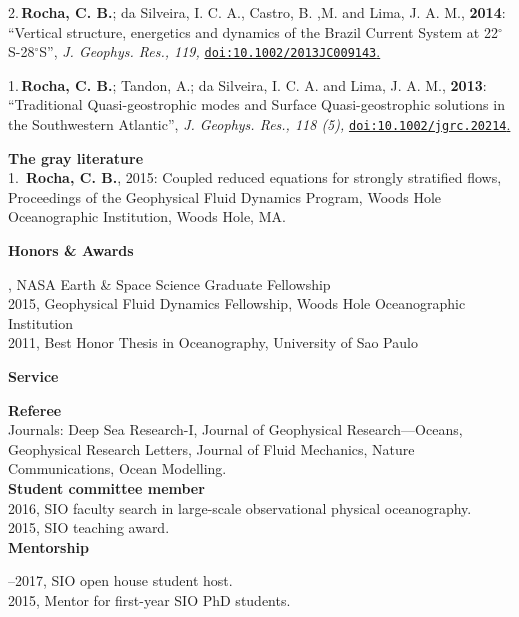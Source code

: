 \documentclass[a4paper,11pt,final]{memoir}
\newcommand{\Sep}{\vspace{1.25em}}
\newcommand{\SmallSep}{\vspace{0.5em}}
\newcommand{\CVSection}[1]
    {\Large\textbf{#1}\par
    \SmallSep\normalsize\normalfont}
\newcommand{\CVItem}[1]
    {\textbf{\color{NavyBlue} #1}}
\begin{document}
\SmallSep

2.\,\textbf{Rocha, C. B.};  da Silveira, I. C. A., Castro, B. ,M. and Lima, J. A. M., \textbf{2014}: ``Vertical structure, energetics and dynamics of the Brazil Current System at 22$^\circ$S-28$^\circ$S'', \textit{ J. Geophys. Res., 119,} \href{http://onlinelibrary.wiley.com/doi/10.1002/2013JC009143/abstract}{\texttt{doi:10.1002/2013JC009143}.}

\SmallSep

1.\,\textbf{Rocha, C. B.}; Tandon, A.; da Silveira, I. C. A. and Lima, J. A. M., \textbf{2013}: ``Traditional Quasi-geostrophic modes and Surface Quasi-geostrophic solutions in the Southwestern Atlantic'', \textit{ J. Geophys. Res., 118 (5),} \href{http://dx.doi.org/10.1002/jgrc.20214}{\texttt{doi:10.1002/jgrc.20214}.}

\SmallSep

\clearpage
\framebreak
\framebreak


\CVItem{The gray literature}\\

1.\, \textbf{Rocha, C. B.}, 2015: Coupled reduced equations for strongly stratified flows,  Proceedings of the Geophysical Fluid Dynamics Program,  Woods Hole Oceanographic Institution, Woods Hole, MA.

\Sep

\CVSection{Honors \& Awards}
2016, NASA Earth \& Space Science Graduate Fellowship\\
2015, Geophysical Fluid Dynamics Fellowship, Woods Hole Oceanographic Institution\\
2011, Best Honor Thesis in Oceanography, University of Sao Paulo

\Sep

\CVSection{Service}

\CVItem{Referee}\\
Journals: Deep Sea Research-I, Journal of Geophysical Research––Oceans,
           Geophysical Research Letters, Journal of
           Fluid Mechanics, Nature Communications, Ocean Modelling. \\

\CVItem{Student committee member}\\
2016, SIO faculty search in large-scale observational physical oceanography.\\
2015,  SIO teaching award.\\

\CVSection{Mentorship}
2015--2017, SIO open house student host.\\
2015,  Mentor for first-year SIO PhD students.
\end{document}
